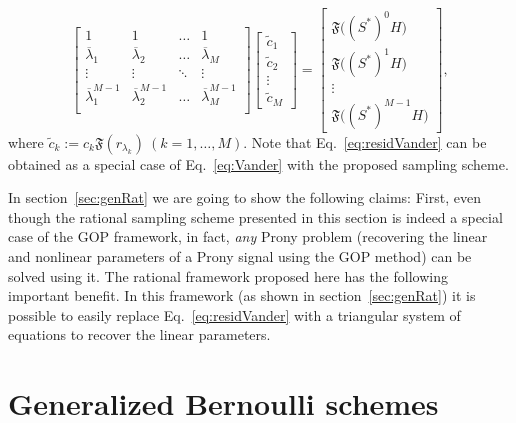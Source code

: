 \documentclass{arxiv}
\newcommand{\funF}{\mathfrak{F}}
\renewcommand{\tilde}{\widetilde}
\begin{document}
\begin{equation}
    \label{eq:residVander}
   \begin{bmatrix}
         1 & 1 & \ldots & 1 \\
         \overline{\lambda}_1 & \overline{\lambda}_2 & \ldots & \overline{\lambda}_{M} \\
         \vdots & \vdots & \ddots & \vdots \\
         \overline{\lambda}_1^{M-1} & \overline{\lambda}_2^{M-1} & \ldots & \overline{\lambda}_{M}^{M-1} \\
    \end{bmatrix}\begin{bmatrix}
         \tilde{c}_1  \\
         \tilde{c}_2 \\
         \vdots \\
         \tilde{c}_M
    \end{bmatrix}  = \begin{bmatrix}
         \funF\big(( S^{\ast} )^{0} H\big) \\
         \funF\big(( S^{\ast})^{1} H\big) \\
         \vdots \\
         \funF\big(( S^{\ast})^{M-1} H\big)
    \end{bmatrix},
\end{equation}
where $\tilde{c}_k := c_k \funF(r_{\lambda_k}) \ (k=1,\ldots,M)$. Note that  Eq.~\eqref{eq:residVander} can be obtained as a special case of Eq.~\eqref{eq:Vander} with the proposed sampling scheme. 

In section~\ref{sec:genRat} we are going to show the following claims: First, even though the rational sampling scheme presented in this section is indeed a special case of the GOP framework, in fact, \textit{any} Prony problem (recovering the linear and nonlinear parameters of a Prony signal using the GOP method) can be solved using it. The rational framework proposed here has the following important benefit. In this framework (as shown in section~\ref{sec:genRat}) it is possible to easily replace Eq.~\eqref{eq:residVander} with a triangular system of equations to recover the linear parameters. 

\section{Generalized Bernoulli schemes}
\label{sec:genBer}
\end{document}
